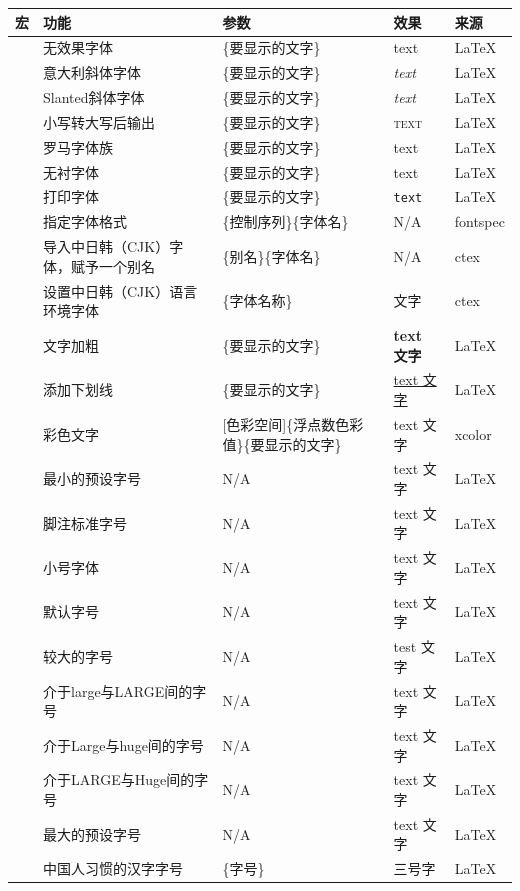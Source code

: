 \begin{center}
	\begin{longtable}{C{2.5cm}C{2.5cm}C{4cm}C{2cm}C{1.5cm}}
		\hline
		宏 & 功能 & 参数 & 效果 & 来源 \\
		\hline
		 & 无效果字体 & \{要显示的文字\} & \textup{text} & \LaTeX \\
		 & 意大利斜体字体 & \{要显示的文字\} & \textit{text} & \LaTeX \\
		 & Slanted斜体字体 & \{要显示的文字\} & \textsl{text} & \LaTeX \\
		 & 小写转大写后输出 & \{要显示的文字\} & \textsc{text} & \LaTeX \\
		 & 罗马字体族 & \{要显示的文字\} & \textrm{text} & \LaTeX \\
		 & 无衬字体 & \{要显示的文字\} & \textsf{text} & \LaTeX \\
		 & 打印字体 & \{要显示的文字\} & \texttt{text} & \LaTeX \\
		 & 指定字体格式 & \{控制序列\}\{字体名\} &  \fontcn N/A & fontspec \\
		 & 导入中日韩（CJK）字体，赋予一个别名 & \{别名\}\{字体名\} &  N/A & ctex \\
		 & 设置中日韩（CJK）语言环境字体 & \{字体名称\} &  文字 & ctex \\
		 & 文字加粗 & \{要显示的文字\} & \textbf{text 文字} & \LaTeX \\
		 & 添加下划线 & \{要显示的文字\} & \underline{text 文字} & \LaTeX \\
		 & 彩色文字 & [色彩空间]\{浮点数色彩值\}\{要显示的文字\} & \textcolor[rgb]{1, 0, 0}{text 文字} & xcolor \\
		 & 最小的预设字号 & N/A & \tiny text 文字 & \LaTeX \\
		 & 脚注标准字号 & N/A & \footnotesize text 文字 & \LaTeX \\
		 & 小号字体 & N/A & \small text 文字 & \LaTeX \\
		 & 默认字号 & N/A & \normalsize text 文字 & \LaTeX \\
		 & 较大的字号 & N/A & \large test 文字 & \LaTeX \\
		 & 介于large与LARGE间的字号 & N/A & \Large text 文字 & \LaTeX \\
		 & 介于Large与huge间的字号 & N/A & \LARGE text 文字 & \LaTeX \\
		 & 介于LARGE与Huge间的字号 & N/A & \huge text 文字 & \LaTeX \\
		 & 最大的预设字号 & N/A & \Huge text 文字 & \LaTeX \\
		 & 中国人习惯的汉字字号 & \{字号\} &  三号字 & \LaTeX \\
		\hline
	\end{longtable}
\end{center}

